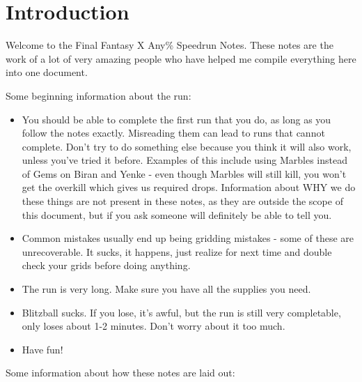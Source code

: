 \chapter{Introduction}

Welcome to the Final Fantasy X Any\% Speedrun Notes. These notes are the work of a lot of very amazing people who have helped me compile everything here into one document.

Some beginning information about the run:

\begin{itemize}
\item You should be able to complete the first run that you do, as long as you follow the notes exactly. Misreading them can lead to runs that cannot complete. Don't try to do something else because you think it will also work, unless you've tried it before. Examples of this include using Marbles instead of Gems on Biran and Yenke - even though Marbles will still kill, you won't get the overkill which gives us required drops. Information about WHY we do these things are not present in these notes, as they are outside the scope of this document, but if you ask someone will definitely be able to tell you.
\item Common mistakes usually end up being gridding mistakes - some of these are unrecoverable. It sucks, it happens, just realize for next time and double check your grids before doing anything.
\item The run is very long. Make sure you have all the supplies you need.
\item Blitzball sucks. If you lose, it's awful, but the run is still very completable, only loses about 1-2 minutes. Don't worry about it too much.
\item Have fun!
\end{itemize}

Some information about how these notes are laid out:

